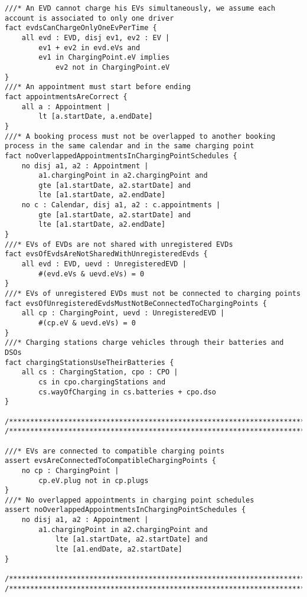 \begin{lstlisting}[language=alloy,label={lst:alloy_code}]
///* An EVD cannot charge his EVs simultaneously, we assume each account is associated to only one driver
fact evdsCanChargeOnlyOneEvPerTime {
	all evd : EVD, disj ev1, ev2 : EV |
		ev1 + ev2 in evd.eVs and
		ev1 in ChargingPoint.eV implies
			ev2 not in ChargingPoint.eV
}
///* An appointment must start before ending
fact appointmentsAreCorrect {
	all a : Appointment |
		lt [a.startDate, a.endDate]
}
///* A booking process must not be overlapped to another booking process in the same calendar and in the same charging point
fact noOverlappedAppointmentsInChargingPointSchedules {
	no disj a1, a2 : Appointment |
		a1.chargingPoint in a2.chargingPoint and
		gte [a1.startDate, a2.startDate] and
		lte [a1.startDate, a2.endDate]
	no c : Calendar, disj a1, a2 : c.appointments |
		gte [a1.startDate, a2.startDate] and
		lte [a1.startDate, a2.endDate]
}
///* EVs of EVDs are not shared with unregistered EVDs
fact evsOfEvdsAreNotSharedWithUnregisteredEvds {
	all evd : EVD, uevd : UnregisteredEVD |
		#(evd.eVs & uevd.eVs) = 0
}
///* EVs of unregistered EVDs must not be connected to charging points
fact evsOfUnregisteredEvdsMustNotBeConnectedToChargingPoints {
	all cp : ChargingPoint, uevd : UnregisteredEVD |
		#(cp.eV & uevd.eVs) = 0
}
///* Charging stations charge vehicles through their batteries and DSOs
fact chargingStationsUseTheirBatteries {
	all cs : ChargingStation, cpo : CPO |
		cs in cpo.chargingStations and
		cs.wayOfCharging in cs.batteries + cpo.dso
}

/************************************************************************************/
/************************************************************************************/

///* EVs are connected to compatible charging points
assert evsAreConnectedToCompatibleChargingPoints {
	no cp : ChargingPoint |
		cp.eV.plug not in cp.plugs
}
///* No overlapped appointments in charging point schedules
assert noOverlappedAppointmentsInChargingPointSchedules {
	no disj a1, a2 : Appointment |
		a1.chargingPoint in a2.chargingPoint and
			lte [a1.startDate, a2.startDate] and
			lte [a1.endDate, a2.startDate]
}

/************************************************************************************/
/************************************************************************************/


\end{lstlisting}

